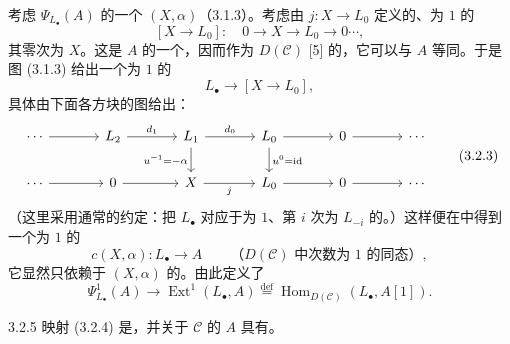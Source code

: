 考虑 $\Psi_{L_\bullet}(A)$ 的一个 $(X,\alpha)$（3.1.3）。考虑由 $j:X\to L_0$ 定义的、为 $1$ 的
\[
[X\longrightarrow L_0]:\quad0\longrightarrow X\longrightarrow L_0\longrightarrow0\cdots,\tag{3.2.1}
\]
其零次为 $X$。这是 $A$ 的一个，因而作为 $D(\mathcal C)$ [5] 的，它可以与 $A$ 等同。于是图 (3.1.3) 给出一个为 $1$ 的
\[
L_\bullet\longrightarrow[X\longrightarrow L_0],\tag{3.2.2}
\]
具体由下面各方块的图给出：
\[
\begin{tikzcd}[column sep=large]
\cdots\arrow[r]&L_2\arrow[r,"d_1"]&L_1\arrow[r,"d_0"]\arrow[d,"u^{-1}=-\alpha"']&L_0\arrow[r]\arrow[d,"u^0=\mathrm{id}"]&0\arrow[r]&\cdots\\
\cdots\arrow[r]&0\arrow[r]&X\arrow[r,"j"']&L_0\arrow[r]&0\arrow[r]&\cdots
\end{tikzcd}\tag{3.2.3}
\]
（这里采用通常的约定：把 $L_\bullet$ 对应于为 $1$、第 $i$ 次为 $L_{-i}$ 的。）这样便在中得到一个为 $1$ 的
\[
c(X,\alpha):L_\bullet\longrightarrow A
\qquad\text{（$D(\mathcal C)$ 中次数为 $1$ 的同态）},\tag{3.2.3}
\]
它显然只依赖于 $(X,\alpha)$ 的。由此定义了
\[
\Psi^1_{L_\bullet}(A)\longrightarrow\operatorname{Ext}^1(L_\bullet,A)
\overset{\mathrm{def}}=\operatorname{Hom}_{D(\mathcal C)}(L_\bullet,A[1]).\tag{3.2.4}
\]
\begin{SGAresult}{}{3.2.5}
映射 (3.2.4) 是，并关于 $\mathcal C$ 的 $A$ 具有。
\end{SGAresult}
